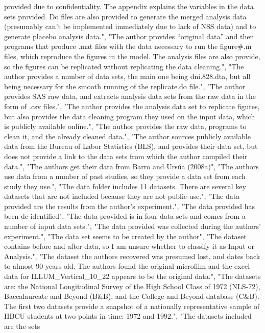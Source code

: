 \documentclass[]{article}
\begin{document}
\begin{itemize}
  provided due to confidentiality. The appendix explains the variables
  in the data sets provided. Do files are also provided to generate the
  merged analysis data (presumably can't be implemented immediately due
  to lack of NSS data) and to generate placebo analysis data.", "The
  author provides ``original data'' and then programs that produce .mat
  files with the data necessary to run the figure\#.m files, which
  reproduce the figures in the model. The analysis files are also
  provide, so the figures can be replicated without replicating the data
  cleaning.", "The author provides a number of data sets, the main one
  being dni.828.dta, but all being necessary for the smooth running of
  the replicate.do file.", "The author provides SAS raw data, and
  extracts analysis data sets from the raw data in the form of .csv
  files.", "The author provides the analysis data set to replicate
  figures, but also provides the data cleaning program they used on the
  input data, which is publicly available online.", "The author provides
  the raw data, programs to clean it, and the already cleaned data.",
  "The author sources publicly available data from the Bureau of Labor
  Statistics (BLS), and provides their data set, but does not provide a
  link to the data sets from which the author compiled their data.",
  "The authors get their data from Barro and Ursúa (2008a)", "The
  authors use data from a number of past studies, so they provide a data
  set from each study they use.", "The data folder includes 11 datasets.
  There are several key datasets that are not included because they are
  not public-use.", "The data provided are the results from the author's
  experiment.", "The data provided has been de-identified", "The data
  provided is in four data sets and comes from a number of input data
  sets.", "The data provided was collected during the authors'
  experiment.", "The data set seems to be created by the author", "The
  dataset contains before and after data, so I am unsure whether to
  classify it as Input or Analysis.", "The dataset the authors recovered
  was presumed lost, and dates back to almost 90 years old. The authors
  found the original microfilm and the excel data for
  ILLUM\_Vertical\_10\_22 appears to be the original data.", "The
  datasets are: the National Longitudinal Survey of the High School
  Class of 1972 (NLS-72), Baccalaureate and Beyond (B\&B), and the
  College and Beyond database (C\&B). The first two datasets provide a
  snapshot of a nationally representative sample of HBCU students at two
  points in time: 1972 and 1992.", "The datasets included are the sets

\end{itemize}
\end{document}

